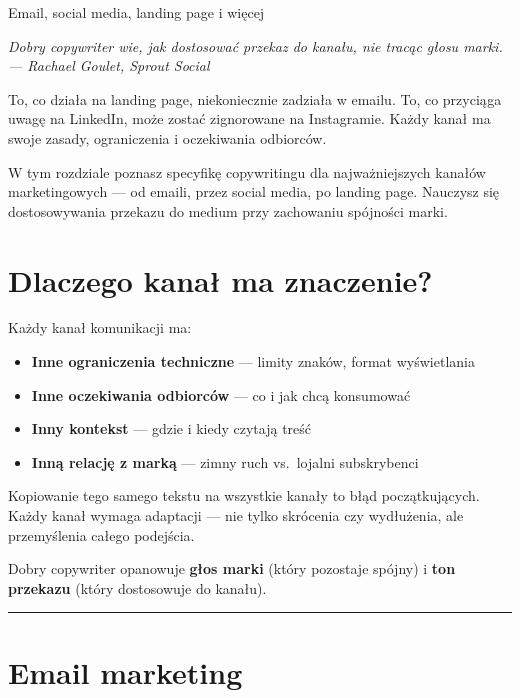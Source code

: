 \documentclass[
  12pt,
  a4paper,
  twoside,
  openright,
  12pt,
  DIV=12,
  BCOR=12mm]{scrbook}
\providecommand{\tightlist}{%
  \setlength{\itemsep}{0pt}\setlength{\parskip}{0pt}}\usepackage{longtable,booktabs,array}
\newcommand{\chapteropener}[1]{%
  \begin{center}
    \large\itshape\color{textmuted}#1
  \end{center}
  \vspace{1em}
}
\newcommand{\decoline}{%
  \begin{center}
    \textcolor{bordergray}{\rule{0.3\textwidth}{0.5pt}}
  \end{center}
}
\begin{document}
Email, social media, landing page i więcej

\hfill\break

\chapteropener{Dobry copywriter wie, jak dostosować przekaz do kanału, nie tracąc głosu marki.\\--- Rachael Goulet, Sprout Social}

To, co działa na landing page, niekoniecznie zadziała w emailu. To, co
przyciąga uwagę na LinkedIn, może zostać zignorowane na Instagramie.
Każdy kanał ma swoje zasady, ograniczenia i oczekiwania odbiorców.

W tym rozdziale poznasz specyfikę copywritingu dla najważniejszych
kanałów marketingowych --- od emaili, przez social media, po landing
page. Nauczysz się dostosowywania przekazu do medium przy zachowaniu
spójności marki.

\section{Dlaczego kanał ma
znaczenie?}\label{dlaczego-kanaux142-ma-znaczenie}

Każdy kanał komunikacji ma:

\begin{itemize}
\tightlist
\item
  \textbf{Inne ograniczenia techniczne} --- limity znaków, format
  wyświetlania
\item
  \textbf{Inne oczekiwania odbiorców} --- co i jak chcą konsumować
\item
  \textbf{Inny kontekst} --- gdzie i kiedy czytają treść
\item
  \textbf{Inną relację z marką} --- zimny ruch vs.~lojalni subskrybenci
\end{itemize}

\begin{wazne}
Kopiowanie tego samego tekstu na wszystkie kanały to błąd początkujących. Każdy kanał wymaga adaptacji --- nie tylko skrócenia czy wydłużenia, ale przemyślenia całego podejścia.
\end{wazne}

Dobry copywriter opanowuje \textbf{głos marki} (który pozostaje spójny)
i \textbf{ton przekazu} (który dostosowuje do kanału).

\decoline

\section{Email marketing}\label{email-marketing-1}
\end{document}
